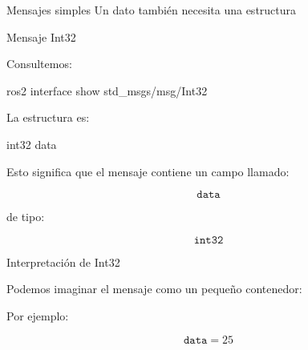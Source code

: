 \documentclass[aspectratio=169]{beamer}
\begin{document}
\SectionSlide
{Mensajes simples}
{Un dato también necesita una estructura}

\begin{frame}[fragile]{Mensaje Int32}

    Consultemos:

    \begin{bashcodedark}
        ros2 interface show std_msgs/msg/Int32
    \end{bashcodedark}

    La estructura es:

    \begin{consolecodedark}
        int32 data
    \end{consolecodedark}

    Esto significa que el mensaje contiene un campo llamado:

    \[
    \texttt{data}
    \]

    de tipo:

    \[
    \texttt{int32}
    \]

\end{frame}

\begin{frame}{Interpretación de Int32}

    Podemos imaginar el mensaje como un pequeño contenedor:

    \begin{center}
    \end{center}

    Por ejemplo:

    \[
    \texttt{data}=25
    \]

    \vspace{0.3cm}


\end{frame}
\end{document}
